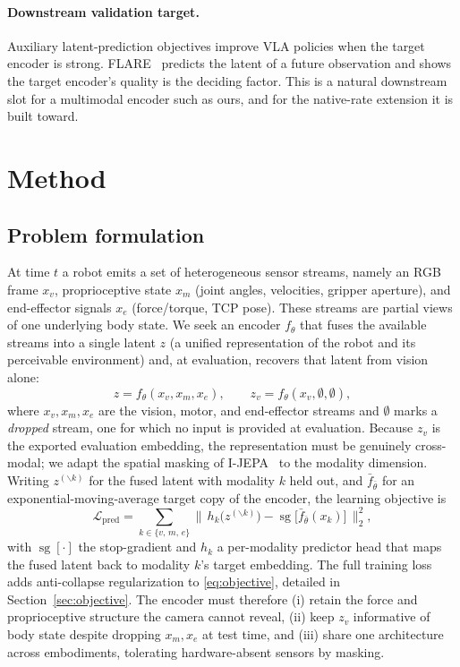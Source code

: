 \documentclass{article}
\begin{document}
\paragraph{Downstream validation target.}
Auxiliary latent-prediction objectives improve VLA policies when the target encoder is strong. FLARE~\citep{flare2025} predicts the latent of a future observation and shows the target encoder's quality is the deciding factor. This is a natural downstream slot for a multimodal encoder such as ours, and for the native-rate extension it is built toward.


\section{Method}
\label{sec:method}

\subsection{Problem formulation}
\label{sec:problem}
At time $t$ a robot emits a set of heterogeneous sensor streams, namely an RGB frame $x_v$, proprioceptive state $x_m$ (joint angles, velocities, gripper aperture), and end-effector signals $x_e$ (force/torque, TCP pose). These streams are partial views of one underlying body state. We seek an encoder $f_\theta$ that fuses the available streams into a single latent $z$ (a unified representation of the robot and its perceivable environment) and, at evaluation, recovers that latent from vision alone:
\begin{equation}
  \label{eq:encoder}
  z = f_\theta(x_v, x_m, x_e), \qquad z_v = f_\theta(x_v, \emptyset, \emptyset),
\end{equation}
where $x_v, x_m, x_e$ are the vision, motor, and end-effector streams and $\emptyset$ marks a \emph{dropped} stream, one for which no input is provided at evaluation. Because $z_v$ is the exported evaluation embedding, the representation must be genuinely cross-modal; we adapt the spatial masking of I-JEPA~\citep{ijepa2023} to the modality dimension. Writing $z^{(\backslash k)}$ for the fused latent with modality $k$ held out, and $\bar f_{\bar\theta}$ for an exponential-moving-average target copy of the encoder, the learning objective is
\begin{equation}
  \label{eq:objective}
  \mathcal{L}_{\text{pred}}
  = \sum_{k \in \{v,\,m,\,e\}}
    \big\lVert\, h_k\!\big(z^{(\backslash k)}\big) - \operatorname{sg}\!\big[\bar f_{\bar\theta}(x_k)\big] \,\big\rVert_2^2,
\end{equation}
with $\operatorname{sg}[\cdot]$ the stop-gradient and $h_k$ a per-modality predictor head that maps the fused latent back to modality $k$'s target embedding. The full training loss adds anti-collapse regularization to \eqref{eq:objective}, detailed in Section~\ref{sec:objective}. The encoder must therefore (i) retain the force and proprioceptive structure the camera cannot reveal, (ii) keep $z_v$ informative of body state despite dropping $x_m, x_e$ at test time, and (iii) share one architecture across embodiments, tolerating hardware-absent sensors by masking.
\end{document}
